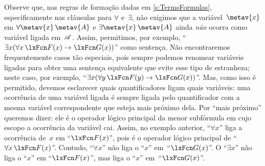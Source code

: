 Observe que, nas regras de formação dadas em \cref{s:TermsFormulas}, especificamente nas cláusulas para $\forall$ e~$\exists$, não exigimos que a variável~$\metav{x}$ em $\forall\metav{x}\,\metav{A}$ e $\exists\metav{x}\,\metav{A}$ ainda \emph{não} ocorra como variável ligada em~$\mathscr{A}$. Assim, permitimos, por exemplo, \textquotedblleft $\exists x(\forall x\,\atom{F}{x} \eif \atom{G}{x})$\textquotedblright{} como sentença. Não encontraremos frequentemente casos tão especiais, pois sempre podemos renomear variáveis ligadas para obter uma sentença equivalente que evite esse tipo de estranheza; neste caso, por exemplo, \textquotedblleft $\exists x(\forall y\,\atom{F}{y} \eif \atom{G}{x})$\textquotedblright{}. Mas, como isso é permitido, devemos esclarecer quais quantificadores ligam quais variáveis: uma ocorrência de uma variável ligada é sempre ligada pelo quantificador com a mesma variável correspondente que esteja mais próximo dela. Por \textquotedblleft mais próximo\textquotedblright{} queremos dizer: ele é o operador lógico principal da menor subfórmula em cujo escopo a ocorrência da variável cai. Assim, no exemplo anterior, \textquotedblleft $\forall x$\textquotedblright{} liga a ocorrência de~$x$ em \textquotedblleft $\atom{F}{x}$\textquotedblright{}, pois é o operador lógico principal de \textquotedblleft $\forall x\,\atom{F}{x}$\textquotedblright{}. Contudo, \textquotedblleft $\forall x$\textquotedblright{} não liga o \textquotedblleft $x$\textquotedblright{} em~\textquotedblleft $\atom{G}{x}$\textquotedblright{}. O \textquotedblleft $\exists x$\textquotedblright{} não liga o \textquotedblleft $x$\textquotedblright{} em \textquotedblleft $\atom{F}{x}$\textquotedblright{}, mas liga o \textquotedblleft $x$\textquotedblright{} em~\textquotedblleft $\atom{G}{x}$\textquotedblright{}.




















